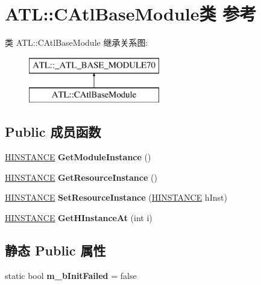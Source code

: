 \hypertarget{class_a_t_l_1_1_c_atl_base_module}{}\section{A\+TL\+:\+:C\+Atl\+Base\+Module类 参考}
\label{class_a_t_l_1_1_c_atl_base_module}
类 A\+TL\+:\+:C\+Atl\+Base\+Module 继承关系图\+:\begin{figure}[H]
\begin{center}
\leavevmode
\includegraphics[height=2.000000cm]{class_a_t_l_1_1_c_atl_base_module}
\end{center}
\end{figure}
\subsection*{Public 成员函数}
\begin{DoxyCompactItemize}
\item 
\mbox{\label{class_a_t_l_1_1_c_atl_base_module_a02aee55456ca801e2ca7c5fda9f81684}} 
\hyperlink{interfacevoid}{H\+I\+N\+S\+T\+A\+N\+CE} {\bfseries Get\+Module\+Instance} ()
\item 
\mbox{\label{class_a_t_l_1_1_c_atl_base_module_a4517c0d5755ea5bb519546f7bb99ef87}} 
\hyperlink{interfacevoid}{H\+I\+N\+S\+T\+A\+N\+CE} {\bfseries Get\+Resource\+Instance} ()
\item 
\mbox{\label{class_a_t_l_1_1_c_atl_base_module_aa52d594e389e2f093e912dd5a6308103}} 
\hyperlink{interfacevoid}{H\+I\+N\+S\+T\+A\+N\+CE} {\bfseries Set\+Resource\+Instance} (\hyperlink{interfacevoid}{H\+I\+N\+S\+T\+A\+N\+CE} h\+Inst)
\item 
\mbox{\label{class_a_t_l_1_1_c_atl_base_module_a69ce65a14ca9be7db75f9c92d21c56a7}} 
\hyperlink{interfacevoid}{H\+I\+N\+S\+T\+A\+N\+CE} {\bfseries Get\+H\+Instance\+At} (int i)
\end{DoxyCompactItemize}
\subsection*{静态 Public 属性}
\begin{DoxyCompactItemize}
\item 
\mbox{\label{class_a_t_l_1_1_c_atl_base_module_a5c34cdc1bdbaba34ae530dfdbd46eab5}} 
static bool {\bfseries m\+\_\+b\+Init\+Failed} = false
\end{DoxyCompactItemize}
